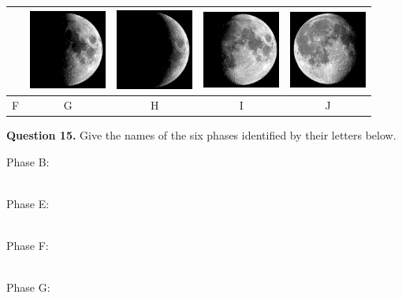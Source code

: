 \documentclass[11pt]{article}
\begin{document}
\begin{center}
\begin{tabular}{|c|c|c|c|c|}
{} & 
\parbox{1in}{\vspace*{0.1cm}
\includegraphics[width=1in]{first_q}
} & 
\parbox{1in}{\vspace*{0.1cm}
\includegraphics[width=1in]{moon_02}
} & 
\parbox{1in}{\vspace*{0.1cm}
\includegraphics[width=1in]{moon_04}
} & 
\parbox{1in}{\vspace*{0.1cm}
\includegraphics[width=1in]{moon_03}
} \\
\hline
F & G & H & I & J \\\hline
\end{tabular}
\end{center}

\noindent
\textbf{Question 15.} Give the names of the six phases identified by their
letters below. 

\noindent
Phase B:
\vspace*{0.5cm}

\hrulefill\\
\noindent
Phase E:
\vspace*{0.5cm}

\hrulefill\\
\noindent
Phase F:
\vspace*{0.5cm}

\hrulefill\\
\noindent
Phase G:
\vspace*{0.5cm}
\end{document}
